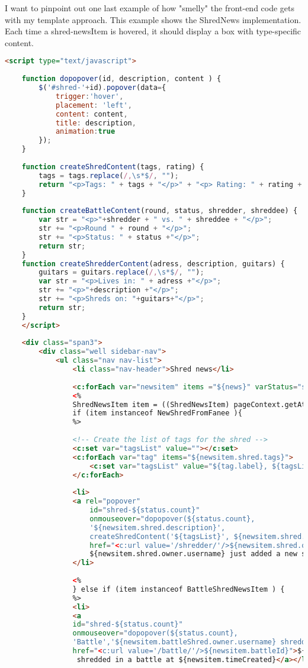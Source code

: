 		  I want to pinpoint out one last example of how "smelly" the front-end code gets with my template approach. This example shows the ShredNews implementation. Each time a shred-newsItem is hovered, it should display a box with type-specific content.
	\begin{lstlisting}[language=html]	
	<script type="text/javascript">
	
	function dopopover(id, description, content ) {
		$('#shred-'+id).popover(data={
			trigger:'hover',
			placement: 'left',
			content: content,
			title: description,
			animation:true
		});
	}
	
	function createShredContent(tags, rating) {
		tags = tags.replace(/,\s*$/, "");
		return "<p>Tags: " + tags + "</p>" + "<p> Rating: " + rating + "</p>";
	}
	
	function createBattleContent(round, status, shredder, shreddee) {
		var str = "<p>"+shredder + " vs. " + shreddee + "</p>";
		str += "<p>Round " + round + "</p>";
		str += "<p>Status: " + status +"</p>";
		return str;	
	}
	function createShredderContent(adress, description, guitars) {
		guitars = guitars.replace(/,\s*$/, "");
		var str = "<p>Lives in: " + adress +"</p>";
		str += "<p>"+description +"</p>";
		str += "<p>Shreds on: "+guitars+"</p>";
		return str;	
	}
	</script>
	
	<div class="span3">
		<div class="well sidebar-nav">
			<ul class="nav nav-list">
				<li class="nav-header">Shred news</li>
				
				<c:forEach var="newsitem" items ="${news}" varStatus="status">
				<%  
				ShredNewsItem item = ((ShredNewsItem) pageContext.getAttribute("newsitem"));
				if (item instanceof NewShredFromFanee ){		 
				%>
				
				<!-- Create the list of tags for the shred -->
				<c:set var="tagsList" value=""></c:set>
				<c:forEach var="tag" items="${newsitem.shred.tags}">
					<c:set var="tagsList" value="${tag.label}, ${tagsList}" /> 
				</c:forEach>		
							
				<li>
				<a rel="popover" 
					id="shred-${status.count}" 
					onmouseover="dopopover(${status.count},
					'${newsitem.shred.description}', 
					createShredContent('${tagsList}', ${newsitem.shred.rating.rating}));"
					href="<c:url value='/shredder/'/>${newsitem.shred.owner.id}">
					${newsitem.shred.owner.username} just added a new shred at ${newsitem.timeCreated}</a>
				</li>
		
				<%
				} else if (item instanceof BattleShredNewsItem ) {
				%>
				<li>
				<a
				id="shred-${status.count}" 
				onmouseover="dopopover(${status.count},
				'Battle','${newsitem.battleShred.owner.username} shredded in round ${newsitem.battleShred.round}');"
				href="<c:url value='/battle/'/>${newsitem.battleId}">${newsitem.battleShred.owner.username}
				 shredded in a battle at ${newsitem.timeCreated}</a></li>
				

\end{lstlisting}
